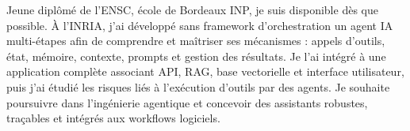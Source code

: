 
\begin{cvparagraph}
Jeune diplômé de l’ENSC, école de Bordeaux INP, je suis disponible dès que possible. À l’INRIA, j’ai développé sans framework d’orchestration un agent IA multi-étapes afin de comprendre et maîtriser ses mécanismes : appels d’outils, état, mémoire, contexte, prompts et gestion des résultats. Je l’ai intégré à une application complète associant API, RAG, base vectorielle et interface utilisateur, puis j’ai étudié les risques liés à l’exécution d’outils par des agents. Je souhaite poursuivre dans l’ingénierie agentique et concevoir des assistants robustes, traçables et intégrés aux workflows logiciels.
\end{cvparagraph}
